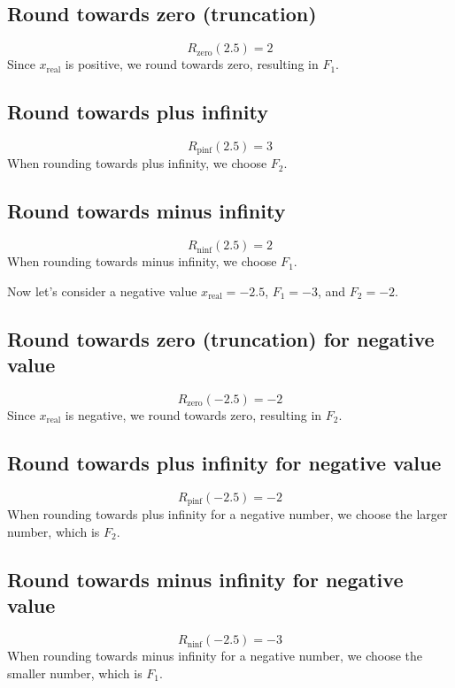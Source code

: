 \documentclass[12pt,openany, tikz,border=10pt]{book}
\begin{document}
			      	\subsection*{Round towards zero (truncation)}
			      	\[ R_{\text{zero}}(2.5) = 2 \]
			      	Since \( x_{\text{real}} \) is positive, we round towards zero, resulting in \( F_1 \).
			      	
			      	\subsection*{Round towards plus infinity}
			      	\[ R_{\text{pinf}}(2.5) = 3 \]
			      	When rounding towards plus infinity, we choose \( F_2 \).
			      	
			      	\subsection*{Round towards minus infinity}
			      	\[ R_{\text{ninf}}(2.5) = 2 \]
			      	When rounding towards minus infinity, we choose \( F_1 \).
			      	
			      	Now let's consider a negative value \( x_{\text{real}} = -2.5 \), \( F_1 = -3 \), and \( F_2 = -2 \).
			      	
			      	\subsection*{Round towards zero (truncation) for negative value}
			      	\[ R_{\text{zero}}(-2.5) = -2 \]
			      	Since \( x_{\text{real}} \) is negative, we round towards zero, resulting in \( F_2 \).
			      	
			      	\subsection*{Round towards plus infinity for negative value}
			      	\[ R_{\text{pinf}}(-2.5) = -2 \]
			      	When rounding towards plus infinity for a negative number, we choose the larger number, which is \( F_2 \).
			      	
			      	\subsection*{Round towards minus infinity for negative value}
			      	\[ R_{\text{ninf}}(-2.5) = -3 \]
			      	When rounding towards minus infinity for a negative number, we choose the smaller number, which is \( F_1 \).
			      	
\end{document}
